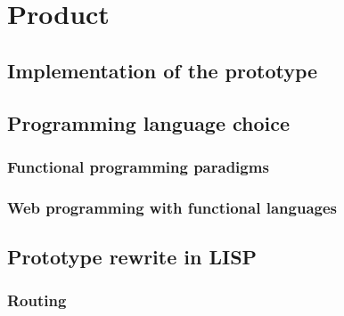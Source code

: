 \chapter{Product}\label{chap:product}

\section{Implementation of the prototype}

\cite{brandt2008opportunistic}

\section{Programming language choice}


\subsection{Functional programming paradigms}


\cite{hughes1989functional}


\cite{halloway2009programming, fogus2011joy}


\cite{kraus2009multi}


\subsection{Web programming with functional languages}


\section{Prototype rewrite in LISP}


\subsection{Routing}


